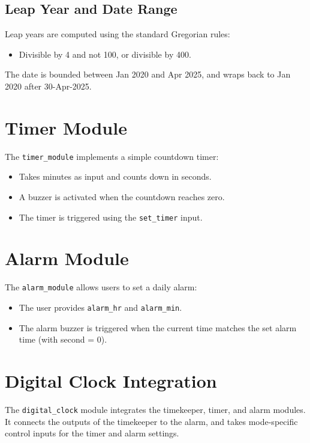 \documentclass[11pt]{article}
\begin{document}
\subsection{Leap Year and Date Range}
Leap years are computed using the standard Gregorian rules:
\begin{itemize}
  \item Divisible by 4 and not 100, or divisible by 400.
\end{itemize}
The date is bounded between Jan 2020 and Apr 2025, and wraps back to Jan 2020 after 30-Apr-2025.

\section{Timer Module}
The \texttt{timer\_module} implements a simple countdown timer:
\begin{itemize}
  \item Takes minutes as input and counts down in seconds.
  \item A buzzer is activated when the countdown reaches zero.
  \item The timer is triggered using the \texttt{set\_timer} input.
\end{itemize}

\section{Alarm Module}
The \texttt{alarm\_module} allows users to set a daily alarm:
\begin{itemize}
  \item The user provides \texttt{alarm\_hr} and \texttt{alarm\_min}.
  \item The alarm buzzer is triggered when the current time matches the set alarm time (with second = 0).
\end{itemize}

\section{Digital Clock Integration}
The \texttt{digital\_clock} module integrates the timekeeper, timer, and alarm modules. It connects the outputs of the timekeeper to the alarm, and takes mode-specific control inputs for the timer and alarm settings.
\end{document}
